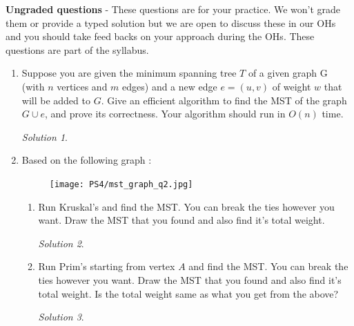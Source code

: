\documentclass[12pt]{article}
\theoremstyle{remark}
\newtheorem*{solution}{Solution}
\begin{document}
\pagebreak
\textbf{Ungraded questions} - These questions are for your practice. We won't grade them or provide a typed solution but we are open to discuss these in our OHs and you should take feed backs on your approach during the OHs. These questions are part of the syllabus. 

\begin{enumerate}

\item Suppose you are given the minimum spanning tree $T$ of a given graph G (with $n$ vertices and $m$ edges) and a new edge $e=(u,v)$ of weight $w$ that will be added to $G$. Give an efficient algorithm to find the MST of the graph $G\cup e$, and prove its correctness. Your algorithm should run in $O(n)$ time.\\
\begin{solution}

\end{solution}

\item Based on the following graph :
\begin{figure}[h!]
\begin{center}
\texttt{[image: PS4/mst\_graph\_q2.jpg]} 
\end{center}
\end{figure}

\begin{enumerate}[label=(\alph*)]

\item Run Kruskal's and find the MST. You can break the ties however you want. Draw the MST that you found and also find it's total weight.
\begin{solution}

\end{solution}
\pagebreak
\item Run Prim's starting from vertex $A$ and find the MST. You can break the ties however you want. Draw the MST that you found and also find it's total weight. Is the total weight same as what you get from the above?
\begin{solution}

\end{solution}
 
\end{enumerate}


\end{enumerate}
\end{document}
